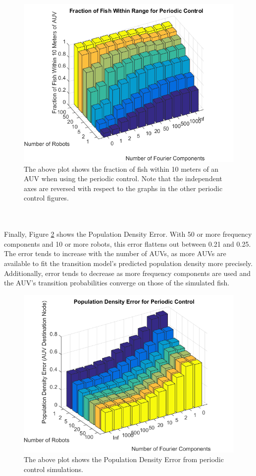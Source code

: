 \documentclass[11pt,letterpaper]{article}
\begin{document}
	\begin{figure}
		\centering
		\includegraphics[width = 0.7\linewidth]{results/periodicFraction}
		\caption{The above plot shows the fraction of fish within 10 meters of an AUV when using the periodic control. Note that the independent axes are reversed with respect to the graphs in the other periodic control figures.}
		\label{fig:periodicFraction}
	\end{figure}
	\\\\
	Finally, Figure \ref{fig:periodicDensity} shows the Population Density Error. With 50 or more frequency components and 10 or more robots, this error flattens out between 0.21 and 0.25. The error tends to increase with the number of AUVs, as more AUVs are available to fit the transition model's predicted population density more precisely. Additionally, error tends to decrease as more frequency components are used and the AUV's transition probabilities converge on those of the simulated fish.  
	\begin{figure}
		\centering
		\includegraphics[width = 0.7\linewidth]{results/periodicDensity}
		\caption{The above plot shows the Population Density Error from periodic control simulations.}
		\label{fig:periodicDensity}
	\end{figure}
	
\end{document}
